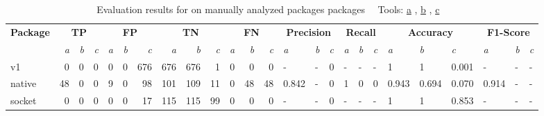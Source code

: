 \begin{table}[htp!]
    \centering
    \caption[Evaluation results for \toolSafer{} on manually analyzed packages packages]
        {Evaluation results for \toolSafer{} on manually analyzed packages packages~\newline \tiny ~\newline \footnotesize
        Tools: \underline{a} \toolSafer{}, \underline{b} \toolVet{}, \underline{c} \toolGosec{} \tiny ~\newline}
    \label{tbl:gosafer-evaluation-packages}
    \begin{adjustbox}{max width=\textwidth}
        \begin{tabular}{l||rrr|rrr|rrr|rrr||lll|lll|lll|lll}
            \textbf{Package} & \multicolumn{3}{c|}{\textbf{TP}}                & \multicolumn{3}{c|}{\textbf{FP}}                 & \multicolumn{3}{c|}{\textbf{TN}}                & \multicolumn{3}{c||}{\textbf{FN}}                & \multicolumn{3}{c|}{\textbf{Precision}} & \multicolumn{3}{c|}{\textbf{Recall}}    & \multicolumn{3}{c|}{\textbf{Accuracy}} & \multicolumn{3}{c}{\textbf{F1-Score}}  \\
            {}               & \textit{a}            & \textit{b} & \textit{c} & \textit{a}             & \textit{b} & \textit{c} & \textit{a}            & \textit{b} & \textit{c} & \textit{a}             & \textit{b} & \textit{c} & \textit{a}    & \textit{b} & \textit{c} & \textit{a}    & \textit{b} & \textit{c} & \textit{a}   & \textit{b} & \textit{c} & \textit{a}   & \textit{b} & \textit{c} \\
            \hline
            v1               & 0                     & 0          & 0          & 0                      & 0          & 676        & 676                   & 676        & 1          & 0                      & 0          & 0          & -             & -          & 0          & -             & -          & -          & 1            & 1          & 0.001      & -            & -          & -          \\
            native           & 48                    & 0          & 0          & 9                      & 0          & 98         & 101                   & 109        & 11         & 0                      & 48         & 48         & 0.842         & -          & 0          & 1             & 0          & 0          & 0.943        & 0.694      & 0.070      & 0.914        & -          & -          \\
            socket           & 0                     & 0          & 0          & 0                      & 0          & 17         & 115                   & 115        & 99         & 0                      & 0          & 0          & -             & -          & 0          & -             & -          & -          & 1            & 1          & 0.853      & -            & -          & -          \\

\end{tabular}
\end{adjustbox}
\end{table}
